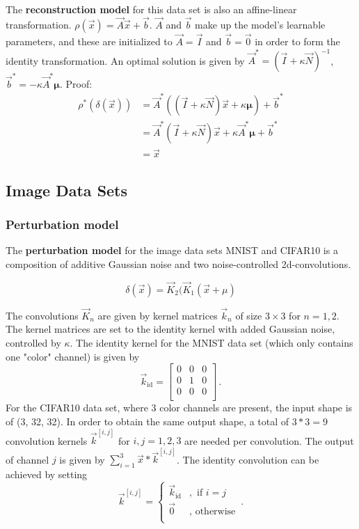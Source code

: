 The \textbf{reconstruction model} for this data set is also an affine-linear transformation. 
$\rho(\vec x) = \vec A \vec x + \vec b$.
$\vec A$ and $\vec b$ make up the model's learnable parameters, and
these are initialized to $\vec A = \vec I$ and $\vec b = \vec 0$ in order to form the identity transformation.
An optimal solution is given by
$\vec A^* = (\vec I + \kappa \vec N)^{-1}$, $\vec b^* = -\kappa \vec A^* \boldsymbol \mu$.
Proof:
\begin{equation}
\label{eqn:gmm_optimal}
\begin{split}
    \rho^* ( \delta (\vec x)) 
    &= \vec A^* ((\vec I + \kappa \vec N)\vec x + \kappa \boldsymbol \mu) + \vec b^* \\
    &= \vec A^* (\vec I + \kappa \vec N)\vec x + \kappa \vec A^* \boldsymbol \mu + \vec b^* \\
    &= \vec x
\end{split}
\end{equation}

\subsection{Image Data Sets}

\subsubsection{Perturbation model}

The \textbf{perturbation model} for the image data sets MNIST and CIFAR10
is a composition of additive Gaussian noise and two noise-controlled 2d-convolutions.

\[
    \delta(\vec x) = \vec K_2(\vec K_1(\vec x + \mu)
\]

The convolutions $\vec K_n$ are given by kernel matrices $\vec k_n$ of size $3\times3$ for $n=1,2$.
The kernel matrices are set to the identity kernel with added Gaussian noise, controlled by $\kappa$.
The identity kernel for the MNIST data set (which only contains one "color" channel) is given by 
\begin{equation*}
    \vec k_{\text{id}} = \begin{bmatrix}
        0 & 0 & 0 \\
        0 & 1 & 0 \\
        0 & 0 & 0 \\
    \end{bmatrix} \,.
\end{equation*}
For the CIFAR10 data set, where 3 color channels are present, the input shape is of (3, 32, 32). 
In order to obtain the same output shape, 
a total of $3*3=9$ convolution kernels $\vec k^{[i,j]}$ for $i,j=1,2,3$ are needed per convolution.
The output of channel $j$ is given by $\sum_{i=1}^{3} \vec x * \vec k^{[i, j]}$.
The identity convolution can be achieved by setting 
\[
    \vec k^{[i,j]} = \begin{cases}
        \vec k_{\text{id}} &, \text{ if } i = j\\
        \vec 0 &, \text{ otherwise} \\
    \end{cases} \,.
\]

